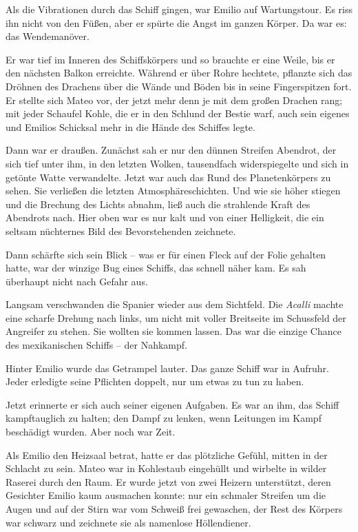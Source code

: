 Als die Vibrationen durch das Schiff gingen, war Emilio auf
Wartungstour. Es riss ihn nicht von den Füßen, aber er spürte die
Angst im ganzen Körper. Da war es: das Wendemanöver.

Er war tief im Inneren des Schiffskörpers und so brauchte er eine
Weile, bis er den nächsten Balkon erreichte. Während er über Rohre
hechtete, pflanzte sich das Dröhnen des Drachens über die Wände und
Böden bis in seine Fingerspitzen fort. Er stellte sich Mateo vor,
der jetzt mehr denn je mit dem großen Drachen rang; mit jeder
Schaufel Kohle, die er in den Schlund der Bestie warf, auch sein
eigenes und Emilios Schicksal mehr in die Hände des Schiffes
legte.

Dann war er draußen. Zunächst sah er nur den dünnen Streifen
Abendrot, der sich tief unter ihm, in den letzten Wolken,
tausendfach widerspiegelte und sich in getönte Watte verwandelte.
Jetzt war auch das Rund des Planetenkörpers zu sehen. Sie verließen
die letzten Atmosphäreschichten. Und wie sie höher stiegen und die
Brechung des Lichts abnahm, ließ auch die strahlende Kraft des
Abendrots nach. Hier oben war es nur kalt und von einer Helligkeit,
die ein seltsam nüchternes Bild des Bevorstehenden zeichnete.

Dann schärfte sich sein Blick – was er für einen Fleck auf der
Folie gehalten hatte, war der winzige Bug eines Schiffs, das
schnell näher kam. Es sah überhaupt nicht nach Gefahr aus.

Langsam verschwanden die Spanier wieder aus dem Sichtfeld. Die
\textit{Acalli} machte eine scharfe Drehung nach links, um nicht mit voller
Breitseite im Schussfeld der Angreifer zu stehen. Sie wollten sie
kommen lassen. Das war die einzige Chance des mexikanischen Schiffs
– der Nahkampf.

Hinter Emilio wurde das Getrampel lauter. Das ganze Schiff war in
Aufruhr. Jeder erledigte seine Pflichten doppelt, nur um etwas zu
tun zu haben.

\bigpar

Jetzt erinnerte er sich auch seiner eigenen Aufgaben. Es war an
ihm, das Schiff kampftauglich zu halten; den Dampf zu lenken, wenn
Leitungen im Kampf beschädigt wurden. Aber noch war Zeit.

Als Emilio den Heizsaal betrat, hatte er das plötzliche Gefühl,
mitten in der Schlacht zu sein. Mateo war in Kohlestaub eingehüllt
und wirbelte in wilder Raserei durch den Raum. Er wurde jetzt von
zwei Heizern unterstützt, deren Gesichter Emilio kaum ausmachen
konnte: nur ein schmaler Streifen um die Augen und auf der Stirn
war vom Schweiß frei gewaschen, der Rest des Körpers war schwarz
und zeichnete sie als namenlose Höllendiener.

